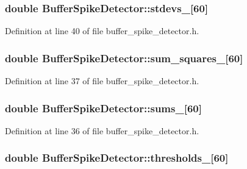 \subsubsection[{stdevs\-\_\-}]{\setlength{\rightskip}{0pt plus 5cm}double {\bf \-Buffer\-Spike\-Detector\-::stdevs\-\_\-}[60]\hspace{0.3cm}{\ttfamily  [private]}}\label{classBufferSpikeDetector_a1ee80d6bbebf18f931797e7d7b8ad3b3}


\-Definition at line 40 of file buffer\-\_\-spike\-\_\-detector.\-h.

\subsubsection[{sum\-\_\-squares\-\_\-}]{\setlength{\rightskip}{0pt plus 5cm}double {\bf \-Buffer\-Spike\-Detector\-::sum\-\_\-squares\-\_\-}[60]\hspace{0.3cm}{\ttfamily  [private]}}\label{classBufferSpikeDetector_afe3961097cfceba76b4349227fe3a32d}


\-Definition at line 37 of file buffer\-\_\-spike\-\_\-detector.\-h.

\subsubsection[{sums\-\_\-}]{\setlength{\rightskip}{0pt plus 5cm}double {\bf \-Buffer\-Spike\-Detector\-::sums\-\_\-}[60]\hspace{0.3cm}{\ttfamily  [private]}}\label{classBufferSpikeDetector_aab07d3d98007d393241add7a5ee74c4c}


\-Definition at line 36 of file buffer\-\_\-spike\-\_\-detector.\-h.

\subsubsection[{thresholds\-\_\-}]{\setlength{\rightskip}{0pt plus 5cm}double {\bf \-Buffer\-Spike\-Detector\-::thresholds\-\_\-}[60]\hspace{0.3cm}{\ttfamily  [private]}}\label{classBufferSpikeDetector_a1749eba91eb8642a947b1ec212675a6d}


